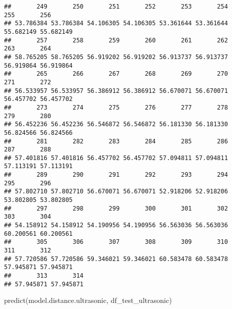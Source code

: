 \documentclass[
]{article}
\newenvironment{Shaded}{\begin{snugshade}}{\end{snugshade}}
\newcommand{\FunctionTok}[1]{\textcolor[rgb]{0.00,0.00,0.00}{#1}}
\newcommand{\NormalTok}[1]{#1}
\begin{document}
\begin{verbatim}
##       249       250       251       252       253       254       255       256 
## 53.786384 53.786384 54.106305 54.106305 53.361644 53.361644 55.682149 55.682149 
##       257       258       259       260       261       262       263       264 
## 58.765205 58.765205 56.919202 56.919202 56.913737 56.913737 56.919864 56.919864 
##       265       266       267       268       269       270       271       272 
## 56.533957 56.533957 56.386912 56.386912 56.670071 56.670071 56.457702 56.457702 
##       273       274       275       276       277       278       279       280 
## 56.452236 56.452236 56.546872 56.546872 56.181330 56.181330 56.824566 56.824566 
##       281       282       283       284       285       286       287       288 
## 57.401816 57.401816 56.457702 56.457702 57.094811 57.094811 57.113191 57.113191 
##       289       290       291       292       293       294       295       296 
## 57.802710 57.802710 56.670071 56.670071 52.918206 52.918206 53.802805 53.802805 
##       297       298       299       300       301       302       303       304 
## 54.158912 54.158912 54.190956 54.190956 56.563036 56.563036 60.200561 60.200561 
##       305       306       307       308       309       310       311       312 
## 57.720586 57.720586 59.346021 59.346021 60.583478 60.583478 57.945871 57.945871 
##       313       314 
## 57.945871 57.945871
\end{verbatim}

\begin{Shaded}
\begin{Highlighting}[]
\FunctionTok{predict}\NormalTok{(model.distance.ultrasonic, df\_test\_ultrasonic)}
\end{Highlighting}
\end{Shaded}
\end{document}
